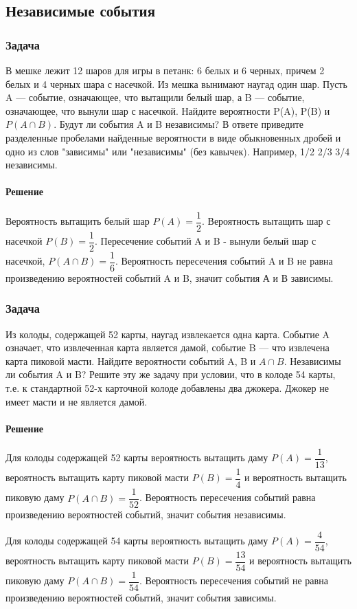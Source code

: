 \documentclass[a4paper,12pt]{article}
\begin{document}
\subsection{Независимые события}
\subsubsection*{Задача}
В мешке лежит 12 шаров для игры в петанк: 6 белых и 6 черных, причем 2 белых и 4 черных шара с насечкой.  Из мешка вынимают наугад один шар. 
Пусть A — событие, означающее, что вытащили белый шар, а B — событие, означающее, что вынули шар с насечкой. Найдите вероятности P(A), P(B) и \(P(A \cap B)\). Будут ли события A и B независимы? В ответе приведите разделенные пробелами найденные вероятности в виде обыкновенных дробей и одно из слов "зависимы" или "независимы" (без кавычек). Например, 1/2 2/3 3/4 независимы.
\paragraph{Решение}
Вероятность вытащить белый шар \(P(A) = \dfrac{1}{2}\). Вероятность вытащить шар с насечкой \(P(B) = \dfrac{1}{2}\). Пересечение событий A и B - вынули белый шар с насечкой, \(P(A \cap B) = \dfrac{1}{6}\). Вероятность пересечения событий A и B не равна произведению вероятностей событий A и B, значит события А и В зависимы.

\subsubsection*{Задача}
Из колоды, содержащей 52 карты, наугад извлекается одна карта. Событие A означает, что извлеченная карта является дамой, событие B — что извлечена карта пиковой масти. Найдите вероятности событий A, B и \(A \cap B\). Независимы ли события A и B? Решите эту же задачу при условии, что в колоде 54 карты, т.е. к стандартной 52-х карточной колоде добавлены два джокера. Джокер не имеет масти и не является дамой.
\paragraph{Решение}
Для колоды содержащей 52 карты вероятность вытащить даму \(P(A)= \dfrac{1}{13}\), вероятность вытащить карту пиковой масти \(P(B)= \dfrac{1}{4}\) и вероятность вытащить пиковую даму \(P(A \cap B)= \dfrac{1}{52}\). Вероятность пересечения событий равна произведению вероятностей событий, значит события независимы.

Для колоды содержащей 54 карты вероятность вытащить даму \(P(A)= \dfrac{4}{54}\), вероятность вытащить карту пиковой масти \(P(B)= \dfrac{13}{54}\) и вероятность вытащить пиковую даму \(P(A \cap B)= \dfrac{1}{54}\). Вероятность пересечения событий не равна произведению вероятностей событий, значит события зависимы.
\end{document}
